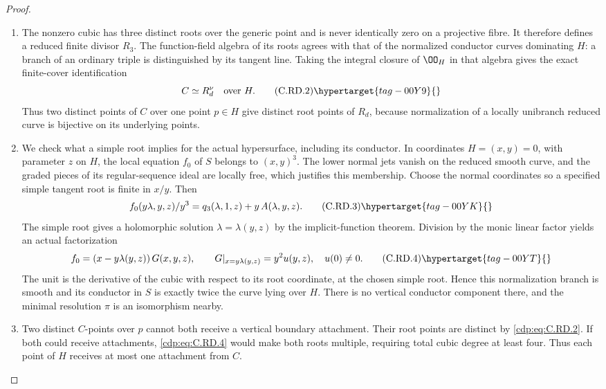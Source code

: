 \begin{proof}

\begin{enumerate}[label={$\langle1\rangle$\arabic*.},leftmargin=*]
\item The nonzero cubic has three distinct roots over the generic
point and is never identically zero on a projective fibre.
It therefore defines a reduced finite divisor $R_3$.
The function-field algebra of its roots agrees with that of
the normalized conductor curves dominating $H$: a branch
of an ordinary triple is distinguished by its tangent line.
Taking the integral closure of $\OO_H$ in that algebra gives
the exact finite-cover identification
\[
                            C\simeq R_d^\nu
                            \quad\text{over }H.
\tag{C.RD.2}\hypertarget{tag-00Y9}{}\label{cdp:eq:C.RD.2}
\]
Thus two distinct points of $C$ over one point $p\in H$
give distinct root points of $R_d$, because normalization
of a locally unibranch reduced curve is bijective on its
underlying points.

\item We check what a simple root implies for the actual
hypersurface, including its conductor. In coordinates
$H=(x,y)=0$, with parameter $z$ on $H$, the local equation
$f_0$ of $S$ belongs to $(x,y)^3$. The lower normal jets
vanish on the reduced smooth curve, and the graded pieces
of its regular-sequence ideal are locally free, which
justifies this membership. Choose the normal coordinates
so a specified simple tangent root is finite in $x/y$.
Then
\[
 f_0(y\lambda,y,z)/y^3
       =q_3(\lambda,1,z)+y\,A(\lambda,y,z).
\tag{C.RD.3}\hypertarget{tag-00YK}{}\label{cdp:eq:C.RD.3}
\]
The simple root gives a holomorphic solution
$\lambda=\lambda(y,z)$ by the implicit-function theorem.
Division by the monic linear factor yields an actual
factorization
\[
 f_0=(x-y\lambda(y,z))\,G(x,y,z),\qquad
 G|_{x=y\lambda(y,z)}=y^2 u(y,z),\quad u(0)\ne0.
\tag{C.RD.4}\hypertarget{tag-00YT}{}\label{cdp:eq:C.RD.4}
\]
The unit is the derivative of the cubic with respect to
its root coordinate, at the chosen simple root. Hence
this normalization branch is smooth and its conductor
in $S$ is exactly twice the curve lying over $H$.
There is no vertical conductor component there, and
the minimal resolution $\pi$ is an isomorphism nearby.

\item Two distinct $C$-points over $p$ cannot both receive a
vertical boundary attachment. Their root points are
distinct by \eqref{cdp:eq:C.RD.2}. If both could receive attachments,
\eqref{cdp:eq:C.RD.4} would make both roots multiple, requiring total
cubic degree at least four. Thus each point of $H$
receives at most one attachment from $C$.


\end{enumerate}
\end{proof}
